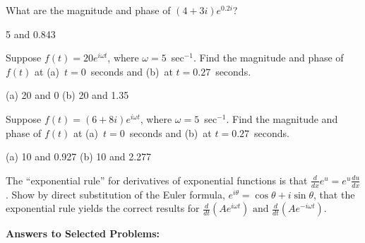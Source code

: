 \begin{Exercise}
What are the magnitude and phase of $(4+3i) e^{0.2i}$?
\end{Exercise}
\begin{Answer}
5 and 0.843
\end{Answer}

\begin{Exercise}
Suppose $f(t)= 20e^{i\omega t}$, where $\omega=5$~sec$^{-1}$.  Find the magnitude and phase of $f(t)$ at (a)~$t=0$~seconds and (b)~at $t=0.27$~seconds.
\end{Exercise}
\begin{Answer}
(a) 20 and 0 (b) 20 and 1.35
\end{Answer}

\begin{Exercise}
Suppose $f(t)= (6+8i) e^{i\omega t}$, where $\omega=5$~sec$^{-1}$.  Find the magnitude and phase of $f(t)$ at (a)~$t=0$~seconds and (b)~at $t=0.27$~seconds.
\end{Exercise}
\begin{Answer}
(a) 10 and 0.927 (b) 10 and 2.277 
\end{Answer}

\begin{Exercise}
The ``exponential rule'' for derivatives of exponential functions is that $\displaystyle \frac{d}{dx} e^u=e^u  \frac{du}{dx}$.  
Show by direct substitution of the Euler formula, $e^{i \theta}=\cos \theta + i \sin \theta$, that the exponential rule yields the correct results for  $\displaystyle \frac{d}{dt} (Ae^{i\omega t}) \text{~and~}  \frac{d}{dt}(Ae^{-i\omega t})$.
\end{Exercise}









\vspace{2in}

\pagebreak[3]

\textbf{Answers to Selected {\thesubsection} Problems:}
\label{complex_numbers_answers}
\shipoutAnswer

\cleardoublepage
